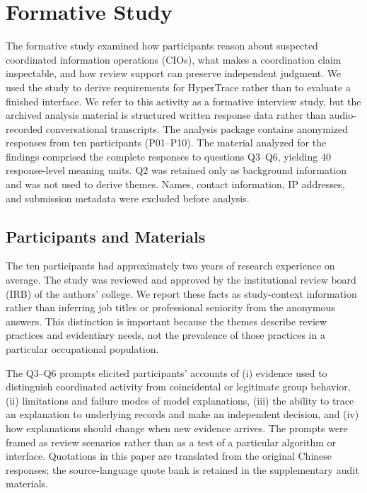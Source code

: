 \section{Formative Study}
\label{sec:formative}

The formative study examined how participants reason about suspected coordinated
information operations (CIOs), what makes a coordination claim inspectable, and
how review support can preserve independent judgment. We used the study to
derive requirements for HyperTrace rather than to evaluate a finished
interface. We refer to this activity as a formative interview study, but the
archived analysis material is structured written response data rather than
audio-recorded conversational transcripts. The analysis package contains
anonymized responses from ten participants (P01--P10). The material analyzed for the
findings comprised the complete responses to questions Q3--Q6, yielding 40
response-level meaning units. Q2 was retained only as background information
and was not used to derive themes. Names, contact information, IP addresses,
and submission metadata were excluded before analysis.

\subsection{Participants and Materials}
\label{sec:formative-participants}

The ten participants had approximately two years of research experience on
average. The study was reviewed and approved by the institutional review board
(IRB) of the authors' college. We report these facts as study-context
information rather than inferring job titles or professional seniority from the
anonymous answers. This distinction is important because the themes describe
review practices and evidentiary needs, not the prevalence of those practices
in a particular occupational population.

The Q3--Q6 prompts elicited participants' accounts of (i) evidence used to
distinguish coordinated activity from coincidental or legitimate group
behavior, (ii) limitations and failure modes of model explanations, (iii) the
ability to trace an explanation to underlying records and make an independent
decision, and (iv) how explanations should change when new evidence arrives.
The prompts were framed as review scenarios rather than as a test of a
particular algorithm or interface. Quotations in this paper are translated
from the original Chinese responses; the source-language quote bank is retained
in the supplementary audit materials.

